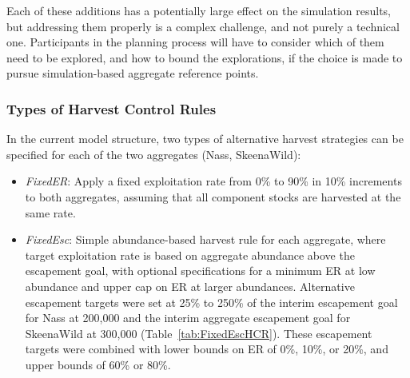\documentclass[french,11pt]{book}
\begin{document}
Each of these additions has a potentially large effect on the simulation results, but addressing them properly is a complex challenge, and not purely a technical one. Participants in the planning process will have to consider which of them need to be explored, and how to bound the explorations, if the choice is made to pursue simulation-based aggregate reference points.

\clearpage

\subsubsection{Types of Harvest Control Rules}\label{types-of-harvest-control-rules}

In the current model structure, two types of alternative harvest strategies can be specified for each of the two aggregates (Nass, SkeenaWild):
\begin{itemize}
\item
  \emph{FixedER}: Apply a fixed exploitation rate from 0\% to 90\% in 10\% increments to both aggregates, assuming that all component stocks are harvested at the same rate.
\item
  \emph{FixedEsc}: Simple abundance-based harvest rule for each aggregate, where target exploitation rate is based on aggregate abundance above the escapement goal, with optional specifications for a minimum ER at low abundance and upper cap on ER at larger abundances. Alternative escapement targets were set at 25\% to 250\% of the interim escapement goal for Nass at 200,000 and the interim aggregate escapement goal for SkeenaWild at 300,000 (Table~\ref{tab:FixedEscHCR}). These escapement targets were combined with lower bounds on ER of 0\%, 10\%, or 20\%, and upper bounds of 60\% or 80\%.
\end{itemize}
\end{document}
